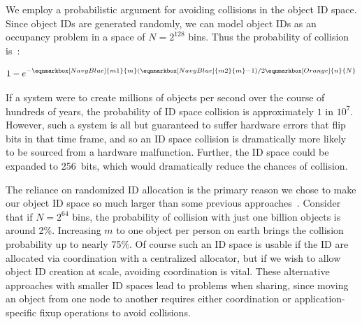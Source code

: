 We employ a probabilistic argument for avoiding collisions in the
object ID space. Since object IDs are generated randomly, we can model object IDs as an occupancy
problem in a space of $N = 2^{128}$ bins. Thus the probability of collision
is~\cite{motwani95}:

\begin{gather*}
    1 - e^{-
            \eqnmarkbox[NavyBlue]{m1}{m}
            (
            \eqnmarkbox[NavyBlue]{m2}{m}
            -1) / 2
            \eqnmarkbox[Orange]{n}{N}
        }
\end{gather*}

If a system were to create millions of objects per second over the course of hundreds of years, the
probability of ID space collision is approximately $1$ in $10^{7}$. However, such a system is all but
guaranteed to suffer hardware errors that flip bits in that time frame, and so an ID space collision is dramatically more likely to be
sourced from a hardware malfunction. Further, the ID space
could be expanded to 256~bits, which would dramatically reduce the chances of collision.

The reliance on randomized ID allocation is the primary reason we chose to make our object ID space
so much larger than some previous approaches~\cite{pmdk,pmdk-pointers}. Consider that if $N = 2^{64}$
bins, the probability of collision with just one billion objects is around 2\%. Increasing $m$ to
one object per person on earth brings the collision probability up to nearly 75\%. Of course such an ID space
is usable if the ID are allocated via coordination with a centralized allocator, but if
we wish to allow object ID creation at scale, avoiding coordination is vital. These alternative approaches with smaller ID spaces lead to problems when
sharing, since moving an object from one node to another requires either coordination or application-specific fixup
operations to avoid collisions.


